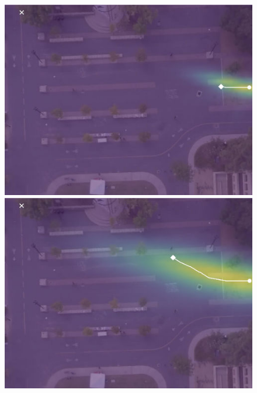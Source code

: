 \documentclass[letterpaper,10pt,conference]{ieeeconf}
\begin{document}
\begin{figure}
	\centering
	\begin{minipage}[c]{0.5cm}
	\end{minipage}
	\begin{minipage}[c]{0.3\linewidth}
		\includegraphics[width=\linewidth]{./figures/bookstore/ours_1_2_t=50.jpg}
	\end{minipage}
	\begin{minipage}[c]{0.3\linewidth}
		\includegraphics[width=\linewidth]{./figures/bookstore/ours_1_2_t=130.jpg}
	\end{minipage}
	\begin{minipage}[c]{0.3\linewidth}

\end{minipage}
\end{figure}
\end{document}
